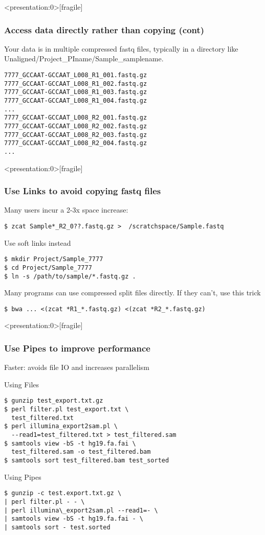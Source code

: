 \documentclass[10pt]{beamer}
\begin{document}
\begin{frame}<presentation:0>[fragile]
\frametitle{Access data directly rather than copying (cont)}

Your data is in multiple compressed fastq files, typically in a directory
like Unaligned/Project\_PIname/Sample\_samplename.  

\begin{verbatim}
7777_GCCAAT-GCCAAT_L008_R1_001.fastq.gz
7777_GCCAAT-GCCAAT_L008_R1_002.fastq.gz
7777_GCCAAT-GCCAAT_L008_R1_003.fastq.gz
7777_GCCAAT-GCCAAT_L008_R1_004.fastq.gz
...
7777_GCCAAT-GCCAAT_L008_R2_001.fastq.gz
7777_GCCAAT-GCCAAT_L008_R2_002.fastq.gz
7777_GCCAAT-GCCAAT_L008_R2_003.fastq.gz
7777_GCCAAT-GCCAAT_L008_R2_004.fastq.gz
...
\end{verbatim}
\end{frame}


\begin{frame}<presentation:0>[fragile]
\frametitle{Use Links to avoid copying fastq files}
Many users incur a 2-3x space increase:

\begin{verbatim}
$ zcat Sample*_R2_0??.fastq.gz >  /scratchspace/Sample.fastq
\end{verbatim}

Use soft links instead
\begin{verbatim}
$ mkdir Project/Sample_7777
$ cd Project/Sample_7777
$ ln -s /path/to/sample/*.fastq.gz .
\end{verbatim}

Many programs can use compressed split files directly.  If they can't, use this trick
\begin{verbatim}
$ bwa ... <(zcat *R1_*.fastq.gz) <(zcat *R2_*.fastq.gz) 
\end{verbatim}
\end{frame}

\begin{frame}<presentation:0>[fragile]
\frametitle{Use Pipes to improve performance}

\vskip10pt
Faster: avoids file IO and increases parallelism

\vskip10pt
Using Files
\begin{verbatim}
$ gunzip test_export.txt.gz 
$ perl filter.pl test_export.txt \
  test_filtered.txt
$ perl illumina_export2sam.pl \
  --read1=test_filtered.txt > test_filtered.sam
$ samtools view -bS -t hg19.fa.fai \
  test_filtered.sam -o test_filtered.bam
$ samtools sort test_filtered.bam test_sorted
\end{verbatim}

Using Pipes
\begin{verbatim}
$ gunzip -c test.export.txt.gz \
| perl filter.pl - - \
| perl illumina\_export2sam.pl --read1=- \
| samtools view -bS -t hg19.fa.fai - \
| samtools sort - test.sorted
\end{verbatim}
\end{frame}
\end{document}
